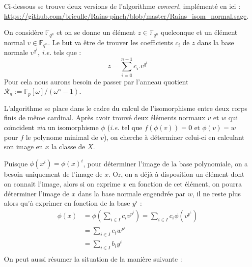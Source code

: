 \documentclass[a4paper]{article} %
\numberwithin{equation}{section}
\newcommand\GF[1]{\mathbb{F}_{#1}}
\begin{document}
\newtheorem{thm}{Thèorème}[subsection]
\newtheorem{lem}[thm]{Lemme}
\newtheorem{cor}{Corollaire}
\newtheorem{prop}[thm]{Proposition}
\theoremstyle{definition}
\newtheorem*{defn}{Définition}
\newtheorem*{ex}{Exemple}
\theoremstyle{remark}
\newtheorem{rem}{Remarque}[subsection]
Ci-dessous se trouve deux versions de l'algorithme \textit{convert}, implémenté en  ici : \url{https://github.com/brieulle/Rains-pinch/blob/master/Rains\_isom\_normal.sage}.\\\par
On considère $\GF{q^n}$ et on se donne un élément $z\in\GF{q^n}$ quelconque et un élément normal $v\in\GF{q^n}$. Le but va être de trouver les coefficients $c_i$ de $z$ dans la base normale $v^{q^i}$, \textit{i.e.} tels que :
\[z = \sum_{i=0}^{n-1}{c_i.v^{q^i}}\]
Pour cela nous aurons besoin de passer par l'anneau quotient $\mathcal{R}_n := \mathbb{F}_p[\omega]/(\omega^n - 1)$.\\\par
L'algorithme se place dans le cadre du calcul de l'isomorphisme entre deux corps finis de même cardinal. Après avoir trouvé deux éléments normaux $v$ et $w$ qui coïncident \textit{via} un isomorphisme $\phi$ (\textit{i.e.} tel que $f(\phi(v)) = 0$ et $\phi(v) = w$ pour $f$ le polynome minimal de $v$), on cherche à déterminer celui-ci en calculant son image en $x$ la classe de $X$.\par

Puisque $\phi(x^i) = \phi(x)^i$, pour déterminer l'image de la base polynomiale, on a besoin uniquement de l'image de $x$. Or, on a déjà à disposition un élément dont on connait l'image, alors si on exprime $x$ en fonction de cet élément, on pourra déterminer l'image de $x$ dans la base normale engendrée par $w$, il ne reste plus alors qu'à exprimer en fonction de la base $y^i$ :
\begin{align*}
\phi(x) &= \phi(\sum_{i\in I}{c_iv^{p^i}})= \sum_{i\in I}{c_i\phi(v^{p^i})}\\
&= \sum_{i\in I}{c_iw^{p^i}}\\
&= \sum_{i\in I}{b_iy^i}\\
\end{align*}
On peut aussi résumer la situation de la manière suivante :
\end{document}
